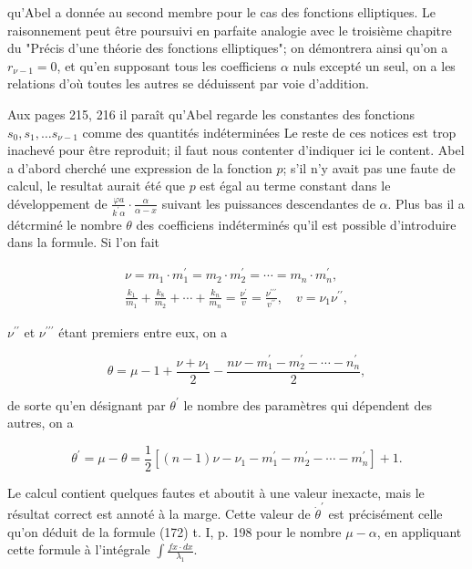\documentclass{article}
\begin{document}
qu'Abel a donnée au second membre pour le cas des fonctions elliptiques. Le raisonnement peut être poursuivi en parfaite analogie avec le troisième chapitre du "Précis d'une théorie des fonctions elliptiques"; on démontrera ainsi qu'on a \(r_{\nu-1}=0\), et qu'en supposant tous les coefficiens \(\alpha\) nuls excepté un seul, on a les relations d'où toutes les autres se déduissent par voie d'addition.

Aux pages 215, 216 il paraît qu'Abel regarde les constantes des fonctions \(s_{0}, s_{1}, \ldots s_{\nu-1}\) comme des quantités indéterminées Le reste de ces notices est trop inachevé pour être reproduit; il faut nous contenter d'indiquer ici le content. Abel a d'abord cherché une expression de la fonction \(p\); s'il n'y avait pas une faute de calcul, le resultat aurait été que \(p\) est égal au terme constant dans le développement de \(\frac{\varphi a}{k^{\prime} \alpha} \cdot \frac{\alpha}{\alpha-x}\) suivant les puissances descendantes de \(\alpha\). Plus bas il a détcrminé le nombre \(\theta\) des coefficiens indéterminés qu'il est possible d'introduire dans la formule. Si l'on fait

\[
\begin{gathered}
\nu=m_{1} \cdot m_{1}^{\prime}=m_{2} \cdot m_{2}^{\prime}=\cdots=m_{n} \cdot m_{n}^{\prime}, \\
\frac{k_{1}}{m_{1}}+\frac{k_{8}}{m_{2}}+\cdots+\frac{k_{n}}{m_{n}}=\frac{\nu^{\prime}}{v}=\frac{\nu^{\prime \prime \prime}}{v^{\prime \prime}}, \quad v=\nu_{1} \nu^{\prime \prime},
\end{gathered}
\]

\(\nu^{\prime \prime}\) et \(\nu^{\prime \prime \prime}\) étant premiers entre eux, on a

\[
\theta=\mu-1+\frac{\nu+\nu_{1}}{2}-\frac{n \nu-m_{1}^{\prime}-m_{2}^{\prime}-\cdots-n_{n}^{\prime}}{2},
\]

de sorte qu'en désignant par \(\theta^{\prime}\) le nombre des paramètres qui dépendent des autres, on a

\[
\theta^{\prime}=\mu-\theta=\frac{1}{2}\left[(n-1) \nu-\nu_{1}-m_{1}^{\prime}-m_{2}^{\prime}-\cdots-m_{n}^{\prime}\right]+1 .
\]

Le calcul contient quelques fautes et aboutit à une valeur inexacte, mais le résultat correct est annoté à la marge. Cette valeur de \(\dot{\theta}^{\prime}\) est précisément celle qu'on déduit de la formule (172) t. I, p. 198 pour le nombre \(\mu-\alpha\), en appliquant cette formule à l'intégrale \(\int \frac{f x \cdot d x}{\lambda_{1}}\).
\end{document}

